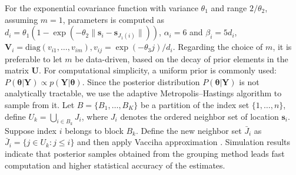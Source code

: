 \documentclass[twoside]{article}
\renewcommand{\/}[1]{\mathbf{\boldsymbol{#1}}}
\begin{document}
For the exponential covariance function with variance $\theta_1$ and range $2/\theta_2$, assuming $m=1$, parameters is computed as $d_i = \theta_1 \left(1 - \exp(-\theta_2 \|\mathbf{s}_i - \mathbf{s}_{J_1(i)}\|) \right)$, $\alpha_i = 6$ and $\beta_i = 5 d_i$,$\mathbf{V}_i = \text{diag}(v_{i1}, \dots, v_{im}), v_{ij} = \exp(-\theta_3 j)/d_i$. Regarding the choice of $m$, it is preferable to let $m$ be data-driven, based on the decay of prior elements in the matrix $\mathbf{U}$.  For computational simplicity, a uniform prior is commonly used: $P(\boldsymbol{\theta}|\mathbf{Y}) \propto p(\mathbf{Y}|\boldsymbol{\theta})$. Since the posterior distribution $P(\boldsymbol{\theta}|\mathbf{Y})$ is not analytically tractable, we use the adaptive Metropolis–Hastings  algorithm to sample from it. 
Let $B = \{B_1, \dots, B_K\}$ be a partition of the index set $\{1, \dots, n\}$, define $U_k = \bigcup_{i \in B_k} J_i$, where $J_i$ denotes the ordered neighbor set of location $\mathbf{s}_i$. Suppose index $i$ belongs to block $B_k$. Define the  new neighbor set $\bar{J}_i$  as $\bar{J}_i = \{j \in U_k : j \leq i\}$ and  then apply Vacciha approximation \citep{mohammadian2025estimating}.
 Simulation results indicate that posterior samples obtained from the grouping method leads  fast computation and higher statistical accuracy of the estimates.
\end{document}
